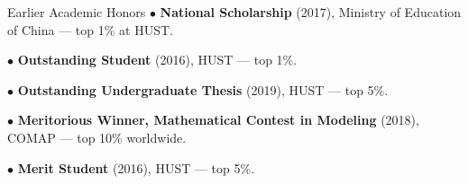 \begin{rSection}{Earlier Academic Honors}
\noindent$\bullet$ \textbf{National Scholarship} (2017), Ministry of Education of China --- top 1\% at HUST.\par
\noindent$\bullet$ \textbf{Outstanding Student} (2016), HUST --- top 1\%.\par
\noindent$\bullet$ \textbf{Outstanding Undergraduate Thesis} (2019), HUST --- top 5\%.\par
\noindent$\bullet$ \textbf{Meritorious Winner, Mathematical Contest in Modeling} (2018), COMAP --- top 10\% worldwide.\par
\noindent$\bullet$ \textbf{Merit Student} (2016), HUST --- top 5\%.\par
\end{rSection}
